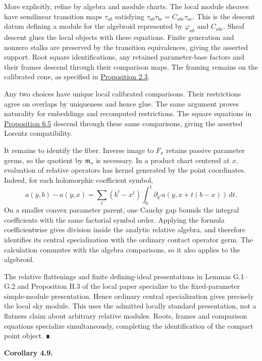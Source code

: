 \documentclass[
  english,
  11pt,
  reqno]{amsart}
\makeatletter
\newcommand{\pandocstatementheading}[1]{%
  \par\addpenalty{\@beginparpenalty}%
  \addvspace{.5\baselineskip plus .2\baselineskip minus .2\baselineskip}%
  {\normalfont\bfseries #1\par}%
  \nobreak\@afterindenttrue\@afterheading
}
\makeatother
\begin{document}
More explicitly, refine by algebra and module charts. The local module
sheaves have semilinear transition maps \(\tau_{ab}\) satisfying
\(\tau_{ab}\tau_{bc}=C_{abc}\tau_{ac}\). This is the descent datum
defining a module for the algebroid represented by \(\varphi_{ab}\) and
\(C_{abc}\). Sheaf descent glues the local objects with these equations.
Finite generation and nonzero stalks are preserved by the transition
equivalences, giving the asserted support. Root square identifications,
any retained parameter-base factors and their frames descend through
their comparison maps. The framing remains on the calibrated cone, as
specified in
\hyperref[prop:independent-local-operator-input]{Proposition 2.3}.

Any two choices have unique local calibrated comparisons. Their
restrictions agree on overlaps by uniqueness and hence glue. The same
argument proves naturality for embeddings and recomputed restrictions.
The square equations in
\hyperref[prop:operator-monodromy-lorentz-reality]{Proposition 6.5}
descend through these same comparisons, giving the asserted Lorentz
compatibility.

It remains to identify the fiber. Inverse image to \(F_x\) retains
passive parameter germs, so the quotient by \(\mathfrak m_x\) is
necessary. In a product chart centered at \(x\), evaluation of relative
operators has kernel generated by the point coordinates. Indeed, for
each holomorphic coefficient symbol, \[
a(y,b)-a(y,x)
=\sum_\ell(b^\ell-x^\ell)
\int_0^1\partial_{b^\ell}a(y,x+t(b-x))\,\mathrm dt.
\] On a smaller convex parameter parent, one Cauchy gap bounds the
integral coefficients with the same factorial symbol order. Applying the
formula coefficientwise gives division inside the analytic relative
algebra, and therefore identifies its central specialization with the
ordinary contact operator germ. The calculation commutes with the
algebra comparisons, so it also applies to the algebroid.

The relative flattenings and finite defining-ideal presentations in
Lemmas G.1--G.2 and Proposition H.3 of the local paper specialize to the
fixed-parameter simple-module presentation. Hence ordinary central
specialization gives precisely the local sky module. This uses the
admitted locally standard presentation, not a flatness claim about
arbitrary relative modules. Roots, frames and comparison equations
specialize simultaneously, completing the identification of the compact
point object. ∎

\pandocstatementheading{\protect{}\label{cor:operator-incidence-enrichment-v08}Corollary 4.9.}
\end{document}
